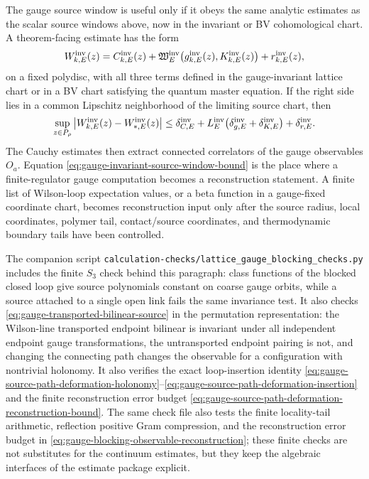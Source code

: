 The gauge source window is useful only if it obeys the same analytic
estimates as the scalar source windows above, now in the invariant or BV
cohomological chart.  A theorem-facing estimate has the form
\begin{equation}
  W_{k,E}^{\rm inv}(z)
  =
  C_{k,E}^{\rm inv}(z)
  +\mathfrak W_E^{\rm inv}
     \!\left(g_{k,E}^{\rm inv}(z),K_{k,E}^{\rm inv}(z)\right)
  +r_{k,E}^{\rm inv}(z),
  \label{eq:gauge-invariant-source-chart}
\end{equation}
on a fixed polydisc, with all three terms defined in the gauge-invariant
lattice chart or in a BV chart satisfying the quantum master equation.  If
the right side lies in a common Lipschitz neighborhood of the limiting
source chart, then
\begin{equation}
  \sup_{z\in P_\rho}
  \left|
    W_{k,E}^{\rm inv}(z)-W_{\ast,E}^{\rm inv}(z)
  \right|
  \leq
  \delta_{C,E}^{\rm inv}
  +L_E^{\rm inv}
    \bigl(
      \delta_{g,E}^{\rm inv}
      +\delta_{K,E}^{\rm inv}
    \bigr)
  +\delta_{r,E}^{\rm inv}.
  \label{eq:gauge-invariant-source-window-bound}
\end{equation}
The Cauchy estimates then extract connected correlators of the gauge
observables \(O_a\).  Equation
\eqref{eq:gauge-invariant-source-window-bound} is the place where a
finite-regulator gauge computation becomes a reconstruction statement.  A
finite list of Wilson-loop expectation values, or a beta function in a
gauge-fixed coordinate chart, becomes reconstruction input only after the
source radius, local coordinates, polymer tail, contact/source coordinates,
and thermodynamic boundary tails have been controlled.

The companion script
\texttt{calculation-checks/lattice\_gauge\_blocking\_checks.py} includes the
finite \(S_3\) check behind this paragraph: class functions of the blocked
closed loop give source polynomials constant on coarse gauge orbits, while a
source attached to a single open link fails the same invariance test.  It also
checks \eqref{eq:gauge-transported-bilinear-source} in the permutation
representation: the Wilson-line transported endpoint bilinear is invariant
under all independent endpoint gauge transformations, the untransported
endpoint pairing is not, and changing the connecting path changes the
observable for a configuration with nontrivial holonomy.  It also verifies
the exact loop-insertion identity
\eqref{eq:gauge-source-path-deformation-holonomy}--\eqref{eq:gauge-source-path-deformation-insertion}
and the finite reconstruction error budget
\eqref{eq:gauge-source-path-deformation-reconstruction-bound}.  The same
check file also tests the finite locality-tail arithmetic, reflection positive Gram
compression, and the reconstruction error budget in
\eqref{eq:gauge-blocking-observable-reconstruction}; these finite checks are
not substitutes for the continuum estimates, but they keep the algebraic
interfaces of the estimate package explicit.

